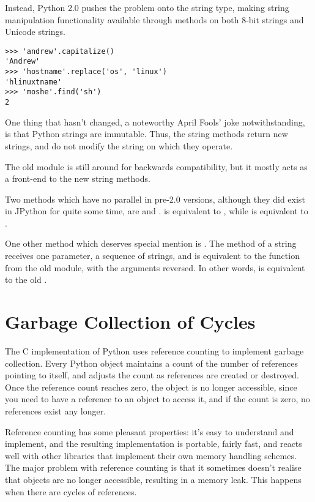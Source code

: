 \documentclass{howto}
\begin{document}
Instead, Python 2.0 pushes the problem onto the string type, making
string manipulation functionality available through methods on both
8-bit strings and Unicode strings.  

\begin{verbatim}
>>> 'andrew'.capitalize()
'Andrew'
>>> 'hostname'.replace('os', 'linux')
'hlinuxtname'
>>> 'moshe'.find('sh')
2
\end{verbatim}

One thing that hasn't changed, a noteworthy April Fools' joke
notwithstanding, is that Python strings are immutable. Thus, the
string methods return new strings, and do not modify the string on
which they operate.

The old  module is still around for backwards
compatibility, but it mostly acts as a front-end to the new string
methods.

Two methods which have no parallel in pre-2.0 versions, although they
did exist in JPython for quite some time, are 
and .   is equivalent to , while  is equivalent to .

One other method which deserves special mention is .  The
 method of a string receives one parameter, a sequence of
strings, and is equivalent to the  function from
the old  module, with the arguments reversed. In other
words,  is equivalent to the old
.

\section{Garbage Collection of Cycles}

The C implementation of Python uses reference counting to implement
garbage collection.  Every Python object maintains a count of the
number of references pointing to itself, and adjusts the count as
references are created or destroyed.  Once the reference count reaches
zero, the object is no longer accessible, since you need to have a
reference to an object to access it, and if the count is zero, no
references exist any longer.  

Reference counting has some pleasant properties: it's easy to
understand and implement, and the resulting implementation is
portable, fairly fast, and reacts well with other libraries that
implement their own memory handling schemes.  The major problem with
reference counting is that it sometimes doesn't realise that objects
are no longer accessible, resulting in a memory leak.  This happens
when there are cycles of references.
\end{document}
